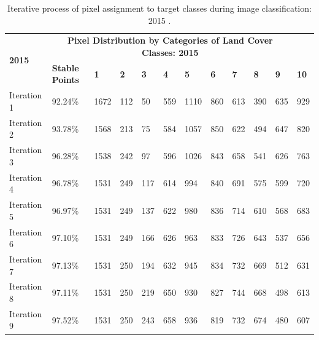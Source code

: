 \documentclass[jimaging,article,accept,pdftex,moreauthors]{Definitions/mdpi}
\begin{document}
\vspace{-6pt}
\begin{table}[H]\scriptsize  
 \caption{Iterative process of pixel assignment to target classes during image classification: 2015%
.}
  \centering
  \begin{tabularx}{\textwidth}{p{1.6cm}p{1.8cm}p{0.55cm}p{0.55cm}p{0.55cm}p{0.55cm}p{0.55cm}p{0.55cm}p{0.55cm}p{0.55cm}p{0.55cm}p{0.9cm}}
  \toprule
  \multirow{2}{*}{\textbf{2015}} & \multicolumn{10}{c}{\textbf{Pixel Distribution by Categories of Land Cover Classes: 2015}} \\
     & \textbf{Stable Points} %
     & \textbf{1} & \textbf{2} &  \textbf{3} & \textbf{4} & \textbf{5} & \textbf{6} & \textbf{7} & \textbf{8} & \textbf{9} & \textbf{10} \\
    \midrule
    Iteration 1 & 92.24\% & 1672 & 112 &  50 &559       &1110
        &860     &   613   &     390        &635     &   929 \\
    Iteration 2 & 93.78\% & 1568    &    213   &      75     &   584    &   1057&
        850   &     622       & 494   &     647     &   820 \\
    Iteration 3 & 96.28\% & 1538   &     242      &   97        &596     &  1026&
        843    &    658      &  541       & 626     &   763 \\
    Iteration 4 & 96.78\% &1531   &     249     &   117  &      614   &     994&
        840   &     691  &      575    &    599       & 720 \\
    Iteration 5 & 96.97\% & 1531   &     249    &    137    &    622      &  980&
        836    &    714 &       610   &     568      &  683 \\
    Iteration 6 & 97.10\% & 1531  &      249    &    166     &  626   &     963&
        833     &   726  &      643    &    537      &  656 \\
    Iteration 7 & 97.13\% & 1531    &    250    &    194   &     632    &    945&
        834    &    732    &    669     &   512    &    631 \\
    Iteration 8 & 97.11\% & 1531    &    250   &     219     &   650    &   930 &
        827  &      744   &     668    &    498     &   613 \\
    Iteration 9 & 97.52\% & 1531  &      250    &    243    &    658 &      936&
        819     &   732  &      674     &   480     &   607 \\

\end{tabularx}
\end{table}
\end{document}
